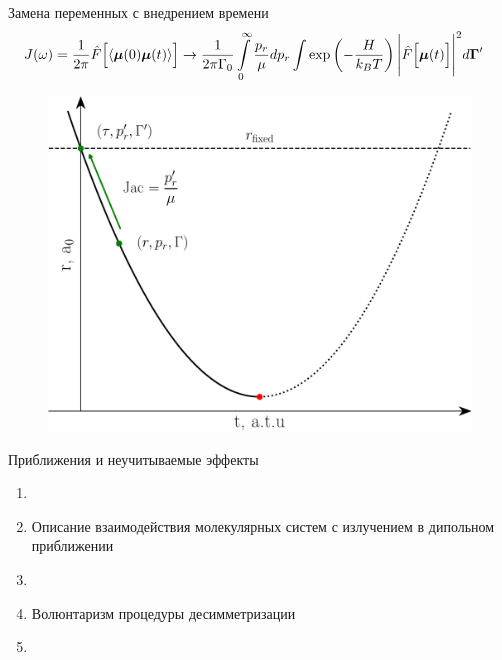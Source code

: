 \documentclass[10pt,usenames,pdf,hyperref={unicode},dvipsnames]{beamer}
\newcommand{\lb}{\left(}
\newcommand{\rb}{\right)}
\newcommand{\bmu}{\boldsymbol{\mu}}
\begin{document}
\begin{frame}{Замена переменных с внедрением времени}
    \vspace*{-1.2cm}
    \begin{gather}
        \hspace*{-0.3cm}
        J(\omega) = \frac{1}{2 \pi} \hat{F} \Big[ \langle \bmu(0) \bmu(t) \rangle \Big] \rightarrow \frac{1}{2 \pi \Gamma_0} \int\limits_0^\infty \frac{p_r}{\mu} dp_r \int \exp \lb -\frac{H}{k_B T} \rb \Bigg\vert \hat{F} \Big[ \bmu(t) \Big] \Bigg\vert^2 d\boldsymbol{\Gamma}^\prime \notag
    \end{gather}
    \vspace*{-0.8cm}
    \begin{figure}[H]
        \includegraphics[width=0.75\linewidth]{./pictures/time-change-crop.pdf}
    \end{figure}
\end{frame}

\begin{frame}{Приближения и неучитываемые эффекты}
    \begin{enumerate}
        \item \color{red}{Приближение Борна-Оппенгеймера} 
        \item Описание взаимодействия молекулярных систем с излучением в дипольном приближении 
        \item {}
        \item Волюнтаризм процедуры десимметризации
        \item \color{green}{Неучет связанных состояний}
    \end{enumerate}
\end{frame}
\end{document}
